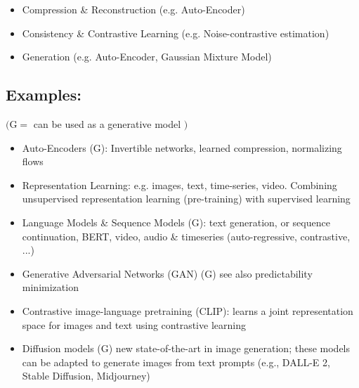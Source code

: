 \begin{itemize}
  \item Compression \& Reconstruction (e.g. Auto-Encoder)

  \item Consistency \& Contrastive Learning (e.g. Noise-contrastive estimation)

  \item Generation (e.g. Auto-Encoder, Gaussian Mixture Model)
\end{itemize}

\subsection*{Examples:}
$(\mathrm{G}=$ can be used as a generative model $)$

\begin{itemize}
  \item Auto-Encoders (G): Invertible networks, learned compression, normalizing flows
  \item Representation Learning: e.g. images, text, time-series, video. Combining unsupervised representation learning (pre-training) with supervised learning

  \item Language Models \& Sequence Models (G): text generation, or sequence continuation, BERT, video, audio \& timeseries (auto-regressive, contrastive, ...)

  \item Generative Adversarial Networks (GAN) (G) see also predictability minimization
  
  \item Contrastive image-language pretraining (CLIP): learns a joint representation space for images and text using contrastive learning

  \item Diffusion models (G) new state-of-the-art in image generation; these models can be adapted to generate images from text prompts (e.g., DALL-E 2, Stable Diffusion, Midjourney)

\end{itemize}